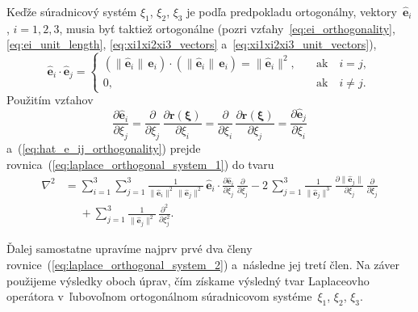 \documentclass[a4paper,12pt]{book}
\let\vec\mathbf
\begin{document}
Keďže súradnicový systém $\xi_1$, $\xi_2$, $\xi_3$ je podľa predpokladu 
ortogonálny, vektory~$\hat{\vec e}_i$, $i = 1, 2, 3$, musia byť taktiež 
ortogonálne (pozri vzťahy~\ref{eq:ei_orthogonality}, \ref{eq:ei_unit_length}, 
\ref{eq:xi1xi2xi3_vectors} a~\ref{eq:xi1xi2xi3_unit_vectors}),
%
\begin{equation}
\label{eq:hat_e_ij_orthogonality}
\hat{\vec e}_i \cdot \hat{\vec e}_j =
%
\begin{cases}
\left( \| \hat{\vec e}_i \| \, \vec e_i \right) \cdot \left( \| \hat{\vec e}_i 
\| \, \vec e_i \right) = \| \hat{\vec e}_i \|^2{,} \quad &\textrm{ak} \quad 
i = j{,}\\
0{,} \quad &\textrm{ak} \quad i \neq j{.}
\end{cases}
\end{equation}
%
Použitím vzťahov
%
\begin{equation}
\label{eq:partials_hat_e}
\frac{\partial \hat{\vec e}_i}{\partial \xi_j} = \frac{\partial}{\partial 
\xi_j} \, \frac{\partial \vec r(\boldsymbol \xi)}{\partial \xi_i} 
= \frac{\partial}{\partial \xi_i} \, \frac{\partial \vec r(\boldsymbol 
\xi)}{\partial \xi_j} = \frac{\partial \hat{\vec e}_j}{\partial \xi_i}
\end{equation}
%
a~(\ref{eq:hat_e_ij_orthogonality}) prejde 
rovnica~(\ref{eq:laplace_orthogonal_system_1}) do tvaru
%
\begin{equation}
\label{eq:laplace_orthogonal_system_2}
\begin{split}
\nabla^2 &= \sum_{i = 1}^{3} \sum_{j = 1}^3 \frac{1}{\| \hat{\vec e}_i \|^2 \, 
\| \hat{\vec e}_j \|^2} \, \hat{\vec e}_i \cdot \frac{\partial \hat{\vec 
e}_i}{\partial \xi_j} \, \frac{\partial}{\partial \xi_j}
- 2\, \sum_{j = 1}^{3} \frac{1}{\|\hat{\vec e}_j \|^3} \, \frac{\partial \| 
\hat{\vec e}_j \|}{\partial \xi_j} \, \frac{\partial}{\partial \xi_j}\\
%
&\phantom{={}}+ \sum_{j = 1}^3 \frac{1}{\| \hat{\vec e}_j \|^2} \, 
\frac{\partial^2}{\partial \xi_j^2}{.}
\end{split}
%
\end{equation}

Ďalej samostatne upravíme najprv prvé dva členy 
rovnice~(\ref{eq:laplace_orthogonal_system_2}) a~následne jej tretí člen.  Na 
záver použijeme výsledky oboch úprav, čím získame výsledný tvar Laplaceovho 
operátora v~ľubovoľnom ortogonálnom súradnicovom systéme~$\xi_1$, $\xi_2$, 
$\xi_3$.
\end{document}
